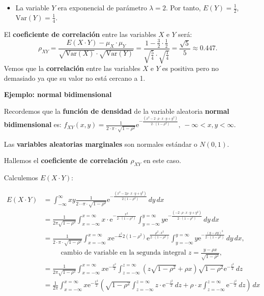 \documentclass[]{book}
\providecommand{\tightlist}{%
  \setlength{\itemsep}{0pt}\setlength{\parskip}{0pt}}
\begin{document}
\begin{itemize}
\tightlist
\item
  La variable \(Y\) era exponencial de parámetro \(\lambda =2\). Por tanto, \(E(Y)=\frac{1}{2}\), \(\mathrm{Var}(Y)=\frac{1}{4}\).
\end{itemize}

El \textbf{coeficiente de correlación} entre las variables \(X\) e \(Y\) será:
\[
\rho_{XY}=\frac{E(X\cdot Y)-\mu_X\cdot \mu_Y}{\sqrt{\mathrm{Var}(X)}\cdot\sqrt{\mathrm{Var}(Y)}}=\frac{1-\frac{3}{2}\cdot \frac{1}{2}}{\sqrt{\frac{5}{4}}\cdot\sqrt{\frac{1}{4}}}=\frac{\sqrt{5}}{5}\approx 0.447.
\]
Vemos que la \textbf{correlación} entre las variables \(X\) e \(Y\) es positiva pero no demasiado ya que su valor no está cercano a 1.

\textbf{Ejemplo: normal bidimensional}

Recordemos que la \textbf{función de densidad} de la variable aleatoria \textbf{normal bidimensional} es:
\(f_{XY}(x,y)=\frac{1}{2\cdot \pi\cdot \sqrt{1-\rho^2}}\mathrm{e}^{-\frac{(x^2-2\cdot \rho \cdot x\cdot y+y^2)}{2\cdot (1-\rho^2)}},\ -\infty <x,y<\infty.\)

Las \textbf{variables aleatorias marginales} son normales estándar o \(N(0,1)\).

Hallemos el \textbf{coeficiente de correlación \(\rho_{XY}\)} en este caso.

Calculemos \(E(X\cdot Y)\):

\[
\begin{array}{rl}
E(X\cdot Y) & = \displaystyle\int_{-\infty}^\infty x y \frac{1}{2\cdot\cdot\pi\cdot\sqrt{1-\rho^2}}\mathrm{e}^{-\frac{(x^2-2\rho\cdot x\cdot y+y^2)}{2(1-\rho^2)}}\, dy\, dx \\
& = \displaystyle\frac{1}{2\pi\sqrt{1-\rho^2}}\int_{x=-\infty}^{x=\infty}x\cdot  \mathrm{e}^{-\frac{x^2}{2\cdot(1-\rho^2)}}\int_{y=-\infty}^{y=\infty}y \mathrm{e}^{-\frac{(-2\cdot\rho\cdot  x\cdot y+y^2)}{2\cdot(1-\rho^2)}}\, dy\, dx \\ & = \displaystyle\frac{1}{2\cdot\pi\cdot\sqrt{1-\rho^2}}\int_{x=-\infty}^{x=\infty}x  \mathrm{e}^{-\frac{x^2}\cdot{2(1-\rho^2)}}  \mathrm{e}^{\frac{\rho^2\cdot x^2}{2\cdot(1-\rho^2)}} \int_{y=-\infty}^{y=\infty}y \mathrm{e}^{-\frac{(y-\rho y)^2}{2\cdot(1-\rho^2)}}\, dy\, dx,\\ &\ \qquad\mbox{ cambio de variable en la segunda integral } z=\frac{y-\rho x}{\sqrt{1-\rho^2}},\\
& = \displaystyle\frac{1}{2\pi\sqrt{1-\rho^2}}\int_{x=-\infty}^{x=\infty}x  \mathrm{e}^{-\frac{x^2}{2}}  \int_{z=-\infty}^{z=\infty} \left(z \sqrt{1-\rho^2}+\rho x\right) \sqrt{1-\rho^2}\mathrm{e}^{-\frac{z^2}{2}}\, dz\, \\
& = \displaystyle\frac{1}{2\pi} \int_{x=-\infty}^{x=\infty}x  \mathrm{e}^{-\frac{x^2}{2}}\left(\sqrt{1-\rho^2}\int_{z=-\infty}^{z=\infty} z\cdot \mathrm{e}^{-\frac{z^2}{2}}\, dz +\rho\cdot x \int_{z=-\infty}^{z=\infty}\mathrm{e}^{-\frac{z^2}{2}}\, dz \right)\, dx
\end{array}
\]
\end{document}

